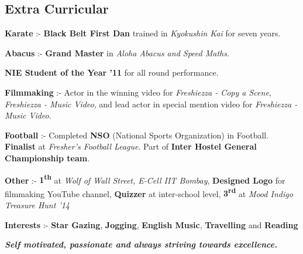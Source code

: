 \documentclass[11pt]{resume}
\begin{document}
\begin{resume}
\section{\mysidestyle Extra Curricular}
\begin{list2}
\item \textbf {Karate} :- \textbf{Black Belt First Dan} trained in \textsl{Kyokushin Kai} for seven years. 
\item \textbf {Abacus} :- \textbf{Grand Master} in \textsl{Aloha Abacus and Speed Maths}. 
\item \textbf {NIE Student of the Year '11} for all round performance. 
\item \textbf {Filmmaking} :- Actor in the winning video for \textsl{Freshiezza - Copy a Scene}, \textsl{Freshiezza - Music Video}, and lead actor in special mention video for \textsl{Freshiezza - Music Video}.

\item \textbf {Football} :- Completed \textbf{NSO} (National Sports Organization) in Football. \textbf{Finalist} at \textsl{Fresher's Football League}. Part of \textbf{Inter Hostel General Championship team}.
\item \textbf {Other} :- \textbf{1\textsuperscript{th}} at \textsl {Wolf of Wall Street, E-Cell IIT Bombay}, \textbf{Designed Logo} for filmmaking YouTube channel, \textbf{Quizzer} at inter-school level, \textbf{3\textsuperscript{rd}} at \textsl{Mood Indigo Treasure Hunt '14}
\item \textbf {Interests} :- \textbf{Star Gazing}, \textbf{Jogging}, \textbf{English Music}, \textbf{Travelling} and \textbf{Reading}

\end{list2}
\textit{\textbf{Self motivated, passionate and always striving towards excellence.}}


    

\end{resume}
\end{document}
